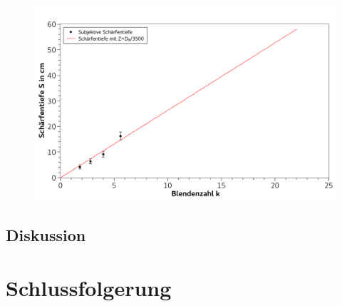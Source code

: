 \documentclass[
	a4paper,
	12pt,
	pagesize,
	ngerman
]{scrartcl}
\begin{document}
	\begin{figure}[H]  %
		\includegraphics[width=1\textwidth]{fig_scharf_tief}
		\centering
		\caption{}
		\label{fig_scharf_tief}
		\centering
	\end{figure}

	\subsection{Diskussion}
	
	\section{Schlussfolgerung}
	
	\printbibliography
\end{document}
